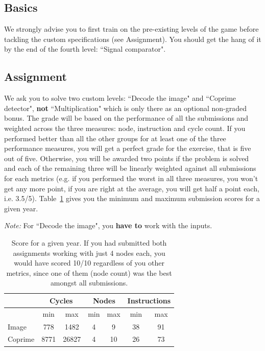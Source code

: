 \documentclass[10pt,a4paper]{article}
\theoremstyle{definition}%
\begin{document}
\subsection{Basics}

We strongly advise you to first train on the pre-existing levels of the game before tackling the custom specifications (see Assignment).
You should get the hang of it by the end of the fourth level: ``Signal comparator".

\subsection{Assignment}
We ask you to solve two custom levels: ``Decode the image" and ``Coprime detector", \textbf{not} ``Multiplication" which is only there as an optional non-graded bonus.
The grade will be based on the performance of all the submissions and weighted across the three measures: node, instruction and cycle count.
If you performed better than all the other groups for at least one of the three performance measures, you will get a perfect grade for the exercise, that is five out of five.
Otherwise, you will be awarded two points if the problem is solved and each of the remaining three will be linearly weighted against all submissions for each metrics (e.g. if you performed the worst in all three measures, you won't get any more point, if you are right at the average, you will get half a point each, i.e. 3.5/5). Table~\ref{tab:scores} gives you the minimum and maximum submission scores for a given year.

\textit{Note:} For ``Decode the image", you \textbf{have to} work with the inputs.

\begin{table}[h]
\centering
\renewcommand{\arraystretch}{1.3} %
\setlength{\tabcolsep}{1em}
\begin{tabular}{lcccccc}
 & \multicolumn{2}{c}{Cycles} & \multicolumn{2}{c}{Nodes} & \multicolumn{2}{c}{Instructions} \\\toprule
 & min & max & min & max & min & max \\\midrule
Image & 778 & 1482 & 4 & 9 & 38 & 91 \\
Coprime & 8771 & 26827 & 4 & 10 & 26 & 73 \\\bottomrule
\end{tabular}
\caption{Score for a given year. If you had submitted both assignments working with just 4 nodes each, you would have scored 10/10 regardless of you other metrics, since one of them (node count) was the best amongst all submissions.}\label{tab:scores}
\end{table}
~\\
\end{document}
